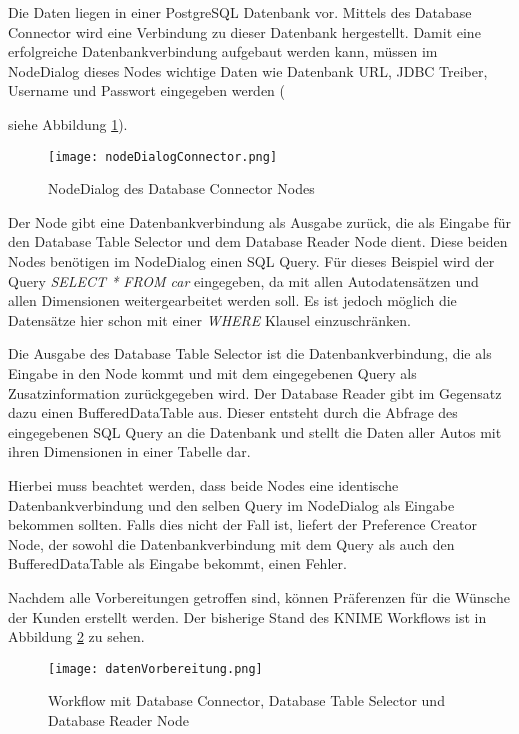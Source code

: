 Die Daten liegen in einer PostgreSQL Datenbank vor. Mittels des Database Connector wird eine Verbindung zu dieser Datenbank hergestellt. Damit eine erfolgreiche Datenbankverbindung aufgebaut werden kann, müssen im NodeDialog dieses Nodes wichtige Daten wie Datenbank URL, JDBC Treiber, Username und Passwort eingegeben werden ({siehe Abbildung \ref{img:nodeDialogConnector}).

\begin{figure}[H]
	\centering
	\texttt{[image: nodeDialogConnector.png]}
	\caption{NodeDialog des Database Connector Nodes}
	\label{img:nodeDialogConnector}
\end{figure} 

Der Node gibt eine Datenbankverbindung als Ausgabe zurück, die als Eingabe für den Database Table Selector und dem Database Reader Node dient. Diese beiden Nodes benötigen im NodeDialog einen SQL Query. Für dieses Beispiel wird der Query \textit{SELECT * FROM car} eingegeben, da mit allen Autodatensätzen und allen Dimensionen weitergearbeitet werden soll. Es ist jedoch möglich die Datensätze hier schon mit einer \textit{WHERE} Klausel einzuschränken.

Die Ausgabe des Database Table Selector ist die Datenbankverbindung, die als Eingabe in den Node kommt und mit dem eingegebenen Query als Zusatzinformation zurückgegeben wird. Der Database Reader gibt im Gegensatz dazu einen BufferedDataTable aus. Dieser entsteht durch die Abfrage des eingegebenen SQL Query an die Datenbank und stellt die Daten aller Autos mit ihren Dimensionen in einer Tabelle dar. 

Hierbei muss beachtet werden, dass beide Nodes eine identische Datenbankverbindung und den selben Query im NodeDialog als Eingabe bekommen sollten. Falls dies nicht der Fall ist, liefert der Preference Creator Node, der sowohl die Datenbankverbindung mit dem Query als auch den BufferedDataTable als Eingabe bekommt, einen Fehler.

Nachdem alle Vorbereitungen getroffen sind, können Präferenzen für die Wünsche der Kunden erstellt werden. Der bisherige Stand des KNIME Workflows ist in Abbildung \ref{img:datenVorbereitung} zu sehen.

\begin{figure}[H]
	\centering
	\texttt{[image: datenVorbereitung.png]}
	\caption{Workflow mit Database Connector, Database Table Selector und Database Reader Node}
	\label{img:datenVorbereitung}
\end{figure} 
}
